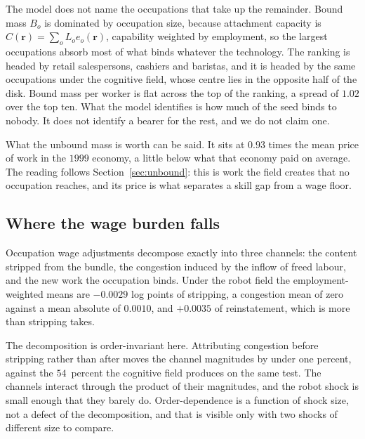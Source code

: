 \documentclass[12pt, a4paper]{article}
\begin{document}
The model does not name the occupations that take up the remainder.
Bound mass $B_o$ is dominated by occupation size, because attachment
capacity is $C(\mathbf{r}) = \sum_o L_o e_o(\mathbf{r})$, capability
weighted by employment, so the largest occupations absorb most of what
binds whatever the technology. The ranking is headed by retail
salespersons, cashiers and baristas, and it is headed by the same
occupations under the cognitive field, whose centre lies in the opposite
half of the disk. Bound mass per worker is flat across the top of the
ranking, a spread of $1.02$ over the top ten. What the model identifies
is how much of the seed binds to nobody. It does not identify a bearer
for the rest, and we do not claim one.

What the unbound mass is worth can be said. It sits at $0.93$ times the
mean price of work in the $1999$ economy, a little below what that
economy paid on average. The reading follows Section~\ref{sec:unbound}:
this is work the field creates that no occupation reaches, and its price
is what separates a skill gap from a wage floor.

\subsection{Where the wage burden falls}
\label{sec:robot-wages}

Occupation wage adjustments decompose exactly into three channels: the
content stripped from the bundle, the congestion induced by the inflow
of freed labour, and the new work the occupation binds. Under the robot
field the employment-weighted means are $-0.0029$ log points of
stripping, a congestion mean of zero against a mean absolute of
$0.0010$, and $+0.0035$ of reinstatement, which is more than stripping
takes.

The decomposition is order-invariant here. Attributing congestion before
stripping rather than after moves the channel magnitudes by under one
percent, against the $54$~percent the cognitive field produces on the
same test. The channels interact through the product of their
magnitudes, and the robot shock is small enough that they barely do.
Order-dependence is a function of shock size, not a defect of the
decomposition, and that is visible only with two shocks of different
size to compare.
\end{document}
